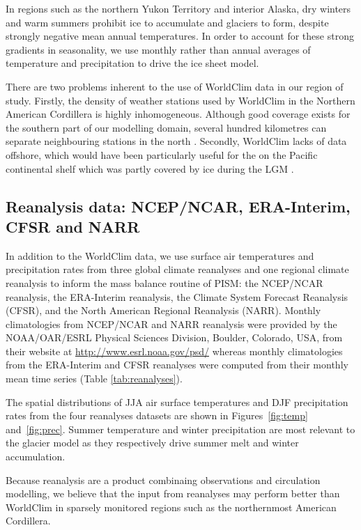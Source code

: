 In regions such as the northern Yukon Territory and interior Alaska, dry winters and warm summers prohibit ice to accumulate and glaciers to form, despite strongly negative mean annual temperatures. In order to account for these strong gradients in seasonality, we use monthly rather than annual averages of temperature and precipitation to drive the ice sheet model.

There are two problems inherent to the use of WorldClim data in our region of study. Firstly, the density of weather stations used by WorldClim in the Northern American Cordillera is highly inhomogeneous. Although good coverage exists for the southern part of our modelling domain, several hundred kilometres can separate neighbouring stations in the north \citep{data:worldclim}. Secondly, WorldClim lacks of data offshore, which would have been particularly useful for the on the Pacific continental shelf which was partly covered by ice during the LGM \citep{jackson-clague-1991}.


\subsection{Reanalysis data: NCEP/NCAR, ERA-Interim, CFSR and NARR}

In addition to the WorldClim data, we use surface air temperatures and precipitation rates from three global climate reanalyses and one regional climate reanalysis to inform the mass balance routine of PISM: the NCEP/NCAR reanalysis, the ERA-Interim reanalysis, the Climate System Forecast Reanalysis (CFSR), and the North American Regional Reanalysis (NARR). Monthly climatologies from NCEP/NCAR and NARR reanalysis were provided by the NOAA/OAR/ESRL Physical Sciences Division, Boulder, Colorado, USA, from their website at \url{http://www.esrl.noaa.gov/psd/} whereas monthly climatologies from the ERA-Interim and CFSR reanalyses were computed from their monthly mean time series (Table \ref{tab:reanalyses}).

The spatial distributions of JJA air surface temperatures and DJF precipitation rates from the four reanalyses datasets are shown in Figures~\ref{fig:temp} and~\ref{fig:prec}. Summer temperature and winter precipitation are most relevant to the glacier model as they respectively drive summer melt and winter accumulation.

Because reanalysis are a product combinaing observations and circulation modelling, we believe that the input from reanalyses may perform better than WorldClim in sparsely monitored regions such as the northernmost American Cordillera.

